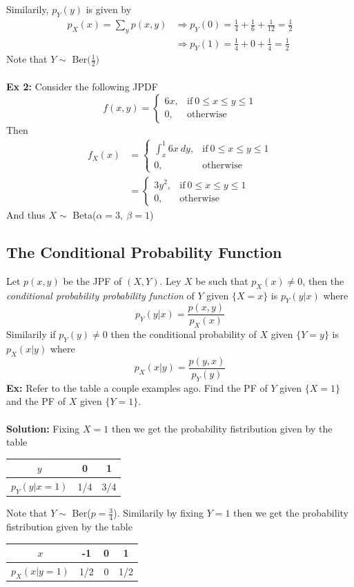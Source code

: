 \documentclass{article}
\newcommand{\ti}[1]{\textit{#1}}
\newcommand{\imply}{\Rightarrow}
\newcommand{\al}{\alpha}
\newcommand{\be}{\beta}
\newcommand{\exx}{\textbf{Ex: }}
\newcommand{\exxii}{\textbf{Ex 2:  }}
\newcommand{\soln}{\textbf{Solution: }}
\begin{document}
Similarily, $p_{Y}(y)$ is given by
\begin{align*}
p_{X}(x) = \sum_{y}p(x, y) &\imply p_{Y}(0) = \frac{1}{4} + \frac{1}{6} + \frac{1}{12} = \frac{1}{2}\\
					&\imply p_{Y}(1) = \frac{1}{4} + 0 + \frac{1}{4} = \frac{1}{2}
\end{align*}
Note that $Y \sim$ Ber$\big(\frac{1}{2}\big)$\\\\
\exxii Consider the following JPDF
\[
f(x, y) =
\begin{cases}
	6x, &\text{if}\ 0 \leq x \leq y \leq 1\\
	0, &\text{otherwise}
\end{cases}
\]
Then
\begin{align*}
f_{X}(x) &=
\begin{cases}
	\int_{x}^{1}6x\ dy, &\text{if}\ 0 \leq x \leq y \leq 1\\
	0, &\text{otherwise}
\end{cases}\\
	&=
\begin{cases}
	3y^{2}, &\text{if}\ 0 \leq x \leq y \leq 1\\
	0, &\text{otherwise}
\end{cases}
\end{align*}
And thus $X \sim$ Beta($\al = 3,\ \be = 1$)
\subsection{The Conditional Probability Function}
Let $p(x, y)$ be the JPF of $(X, Y)$. Ley $X$ be such that $p_{X}(x) \neq  0$, then the \ti{conditional probability probability function} of $Y$ given $\{X=x\}$ is $p_{Y}(y|x)$ where
\[p_{Y}(y|x) = \frac{p(x, y)}{p_{X}(x)}\]
Similarily if $p_{Y}(y) \neq 0$ then the conditional probability of $X$ given $\{Y=y\}$ is $p_{X}(x|y)$ where
\[p_{X}(x|y) = \frac{p(y, x)}{p_{Y}(y)}\]
\exx Refer to the table a couple examples ago. Find the PF of $Y$ given $\{X=1\}$ and the PF of $X$ given $\{Y=1\}$.\\\\
\soln Fixing $X=1$ then we get the probability fistribution given by the table
\begin{center}
\begin{tabular}{c || c | c}
$y$ & 0 & 1 \\
\hline
$p_{Y}(y|x=1)$ & 1/4 & 3/4 \\
\end{tabular}
\end{center}
Note that $Y \sim$ Ber\big($p=\frac{3}{4}$\big).
Similarily by fixing $Y=1$ then we get the probability fistribution given by the table
\begin{center}
\begin{tabular}{c || c | c | c}
$x$ & -1 & 0 & 1 \\
\hline
$p_{X}(x|y=1)$ & 1/2 & 0 & 1/2 \\
\end{tabular}
\end{center}
\end{document}

